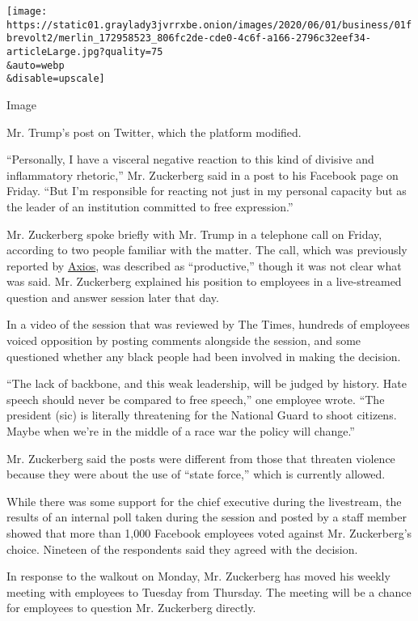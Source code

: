 \texttt{[image: https://static01.graylady3jvrrxbe.onion/images/2020/06/01/business/01fbrevolt2/merlin\_172958523\_806fc2de-cde0-4c6f-a166-2796c32eef34-articleLarge.jpg?quality=75\\\&auto=webp\\\&disable=upscale]}

Image

Mr. Trump's post on Twitter, which the platform modified.

``Personally, I have a visceral negative reaction to this kind of
divisive and inflammatory rhetoric,'' Mr. Zuckerberg said in a post to
his Facebook page on Friday. ``But I'm responsible for reacting not just
in my personal capacity but as the leader of an institution committed to
free expression.''

Mr. Zuckerberg spoke briefly with Mr. Trump in a telephone call on
Friday, according to two people familiar with the matter. The call,
which was previously reported by
\href{https://www.axios.com/trump-facebook-zuckerberg-phone-call-d8d1016e-4e17-4906-b4f4-dc3e5c00bca7.html}{Axios},
was described as ``productive,'' though it was not clear what was said.
Mr. Zuckerberg explained his position to employees in a live-streamed
question and answer session later that day.

In a video of the session that was reviewed by The Times, hundreds of
employees voiced opposition by posting comments alongside the session,
and some questioned whether any black people had been involved in making
the decision.

``The lack of backbone, and this weak leadership, will be judged by
history. Hate speech should never be compared to free speech,'' one
employee wrote. ``The president (sic) is literally threatening for the
National Guard to shoot citizens. Maybe when we're in the middle of a
race war the policy will change.''

Mr. Zuckerberg said the posts were different from those that threaten
violence because they were about the use of ``state force,'' which is
currently allowed.

While there was some support for the chief executive during the
livestream, the results of an internal poll taken during the session and
posted by a staff member showed that more than 1,000 Facebook employees
voted against Mr. Zuckerberg's choice. Nineteen of the respondents said
they agreed with the decision.

In response to the walkout on Monday, Mr. Zuckerberg has moved his
weekly meeting with employees to Tuesday from Thursday. The meeting will
be a chance for employees to question Mr. Zuckerberg directly.

